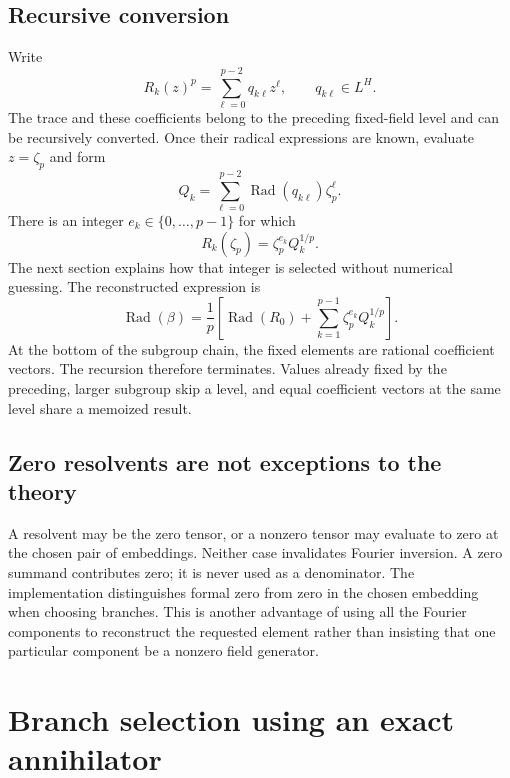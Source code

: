 \documentclass[11pt]{article}
\theoremstyle{definition}\newtheorem{definition}[theorem]{Definition}
\theoremstyle{remark}\newtheorem{remark}[theorem]{Remark}
\begin{document}
\subsection{Recursive conversion}

Write
\begin{equation}\label{eq:qcoeffs}
 R_k(z)^p=\sum_{\ell=0}^{p-2}q_{k\ell}z^\ell,
 \qquad q_{k\ell}\in L^H.
\end{equation}
The trace and these coefficients belong to the preceding fixed-field level
and can be recursively converted. Once their radical expressions are known,
evaluate $z=\zeta_p$ and form
\begin{equation}
 Q_k=\sum_{\ell=0}^{p-2}\operatorname{Rad}(q_{k\ell})\zeta_p^\ell.
\end{equation}
There is an integer $e_k\in\{0,\ldots,p-1\}$ for which
\begin{equation}\label{eq:branchresolvent}
 R_k(\zeta_p)=\zeta_p^{e_k}Q_k^{1/p}.
\end{equation}
The next section explains how that integer is selected without numerical
guessing. The reconstructed expression is
\begin{equation}\label{eq:radicalrecursion}
 \operatorname{Rad}(\beta)
 =\frac1p\left[\operatorname{Rad}(R_0)+
      \sum_{k=1}^{p-1}\zeta_p^{e_k}Q_k^{1/p}\right].
\end{equation}
At the bottom of the subgroup chain, the fixed elements are rational coefficient
vectors. The recursion therefore terminates. Values already fixed by the
preceding, larger subgroup skip a level, and equal coefficient vectors at the
same level share a memoized result.

\subsection{Zero resolvents are not exceptions to the theory}

A resolvent may be the zero tensor, or a nonzero tensor may evaluate to zero
at the chosen pair of embeddings. Neither case invalidates Fourier inversion.
A zero summand contributes zero; it is never used as a denominator. The
implementation distinguishes formal zero from zero in the chosen embedding
when choosing branches. This is another advantage of using all the Fourier
components to reconstruct the requested element rather than insisting that one
particular component be a nonzero field generator.

\section{Branch selection using an exact annihilator}\label{sec:branches}
\end{document}
